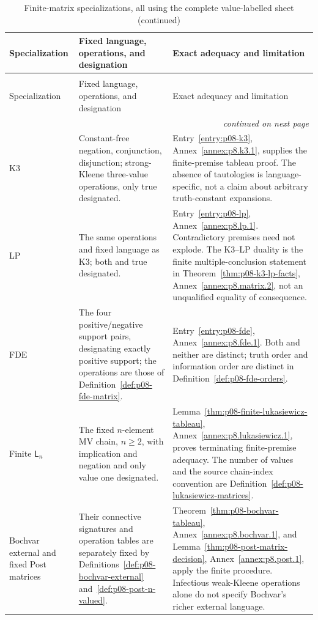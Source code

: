 \begingroup\small
\begin{longtable}{@{}p{.16\linewidth}p{.37\linewidth}p{.39\linewidth}@{}}
\caption{Finite-matrix specializations, all using the complete value-labelled sheet.}
\label{tab:p14-nonclassical-matrices}\\
\toprule
Specialization & Fixed language, operations, and designation & Exact adequacy and limitation \\
\midrule\endfirsthead
\caption[]{Finite-matrix specializations, all using the complete value-labelled sheet (continued)}\\
\toprule Specialization & Fixed language, operations, and designation & Exact adequacy and limitation \\
\midrule\endhead
\midrule\multicolumn{3}{r}{\emph{continued on next page}}\\
\endfoot
\endlastfoot
K3 & Constant-free negation, conjunction, disjunction; strong-Kleene
three-value operations, only true designated. &
Entry~\ref{entry:p08-k3}, Annex~\ref{annex:p8.k3.1}, supplies the finite-premise
tableau proof. The absence of tautologies is language-specific, not a
claim about arbitrary truth-constant expansions. \\
\addlinespace
LP & The same operations and fixed language as K3; both and true
designated. & Entry~\ref{entry:p08-lp}, Annex~\ref{annex:p8.lp.1}.
Contradictory premises need not explode. The K3--LP duality is the finite
multiple-conclusion statement in Theorem~\ref{thm:p08-k3-lp-facts},
Annex~\ref{annex:p8.matrix.2}, not an unqualified equality of consequence. \\
\addlinespace
FDE & The four positive/negative support pairs, designating exactly positive
support; the operations are those of
Definition~\ref{def:p08-fde-matrix}. & Entry~\ref{entry:p08-fde},
Annex~\ref{annex:p8.fde.1}. Both and neither are distinct; truth order and
information order are distinct in Definition~\ref{def:p08-fde-orders}. \\
\addlinespace
Finite \(\mathsf L_n\) & The fixed \(n\)-element MV chain, \(n\geq2\),
with implication and negation and only value one designated. &
Lemma~\ref{thm:p08-finite-lukasiewicz-tableau},
Annex~\ref{annex:p8.lukasiewicz.1}, proves terminating finite-premise
adequacy. The number of values and the source chain-index convention are
Definition~\ref{def:p08-lukasiewicz-matrices}. \\
\addlinespace
Bochvar external and fixed Post matrices & Their connective signatures
and operation tables are separately fixed by
Definitions~\ref{def:p08-bochvar-external} and~\ref{def:p08-post-n-valued}. &
Theorem~\ref{thm:p08-bochvar-tableau}, Annex~\ref{annex:p8.bochvar.1},
and Lemma~\ref{thm:p08-post-matrix-decision}, Annex~\ref{annex:p8.post.1},
apply the finite procedure. Infectious weak-Kleene operations alone do not
specify Bochvar's richer external language. \\
\bottomrule
\end{longtable}\endgroup

